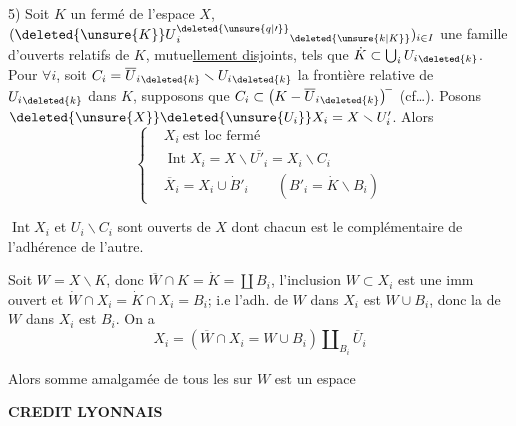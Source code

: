 5) Soit $K$ un fermé de l'espace $X$, $(\deleted{\unsure{K}}U{}^{\deleted{\unsure{q|\prime}}}_i{}_{\deleted{\unsure{k|K}}})_{i\in I}$ une famille d'ouverts relatifs de $K$, mutue\uline{llement disj}oints, tels que $\dot K\subset\bigcup_i U_i{}_{\deleted{k}}$.   Pour $\forall i$, soit $C_i=\overline U_i{}_{\deleted{k}}\smallsetminus U_i{}_{\deleted{k}}$ la frontière relative de $U_i{}_{\deleted{k}}$ dans $K$, supposons que $C_i\subset\bigl(K-\overline U_i{}_{\deleted{k}}\bigr)^{\! -}$ (cf\ldots). Posons $\deleted{\unsure{X}}\deleted{\unsure{U_i}}X_i=X\smallsetminus U'_i$. Alors
\[
\left\{\begin{aligned}
&X_i\ \text{est loc fermé}\\
&\operatorname{Int}X_i=X\smallsetminus\overline{U'_i}=X_i\smallsetminus C_i\\
&\overline X_i=X_i\cup \dot B'_i\qquad(B'_i=\dot K\smallsetminus B_i)
\end{aligned}\right.
\]

$\operatorname{Int}X_i$ et \uline{$U_i\smallsetminus C_i$} sont  ouverts de $X$ dont chacun est le complémentaire de l'adhérence de l'autre.

Soit $W=X\smallsetminus K$,  donc  $\overline W\cap K=\dot K=\coprod B_i$, l'inclusion $W\subset X_i$ est une imm ouvert et $\dot W\cap X_i=\dot K\cap X_i=B_i$;  i.e  l'adh. de $W$ dans $X_i$ est $W\cup B_i$, donc la  de $W$ dans $X_i$ est $B_i$. On a
\[
X_i=(\overline W\cap X_i=W\cup B_i)\amalg_{B_i}\overline U_i
\]


Alors  somme amalgamée de tous les  sur $W$ est un espace

\begin{center}\textsf{\textbf{CREDIT LYONNAIS}}\end{center}


